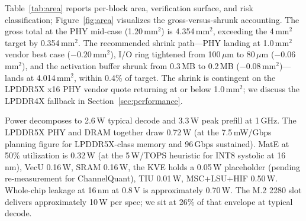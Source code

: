 \documentclass[conference]{IEEEtran}
\begin{document}
Table~\ref{tab:area} reports per-block area, verification surface, and risk classification; Figure~\ref{fig:area} visualizes the gross-versus-shrunk accounting. The gross total at the PHY mid-case (1.20\,mm$^2$) is 4.354\,mm$^2$, exceeding the 4\,mm$^2$ target by 0.354\,mm$^2$. The recommended shrink path---PHY landing at 1.0\,mm$^2$ vendor best case ($-0.20$\,mm$^2$), I/O ring tightened from 100\,$\mu$m to 80\,$\mu$m ($-0.06$\,mm$^2$), and the activation buffer shrunk from 0.3\,MB to 0.2\,MB ($-0.08$\,mm$^2$)---lands at 4.014\,mm$^2$, within 0.4\% of target. The shrink is contingent on the LPDDR5X x16 PHY vendor quote returning at or below 1.0\,mm$^2$; we discuss the LPDDR4X fallback in Section~\ref{sec:performance}.

Power decomposes to 2.6\,W typical decode and 3.3\,W peak prefill at 1\,GHz. The LPDDR5X PHY and DRAM together draw 0.72\,W (at the 7.5\,mW/Gbps planning figure for LPDDR5X-class memory and 96\,Gbps sustained). MatE at 50\% utilization is 0.32\,W (at the 5\,W/TOPS heuristic for INT8 systolic at 16\,nm), VecU 0.16\,W, SRAM 0.16\,W, the KVE holds a 0.05\,W placeholder (pending re-measurement for ChannelQuant), TIU 0.01\,W, MSC+LSU+HIF 0.50\,W. Whole-chip leakage at 16\,nm at 0.8\,V is approximately 0.70\,W. The M.2 2280 slot delivers approximately 10\,W per spec; we sit at 26\% of that envelope at typical decode.
\end{document}
